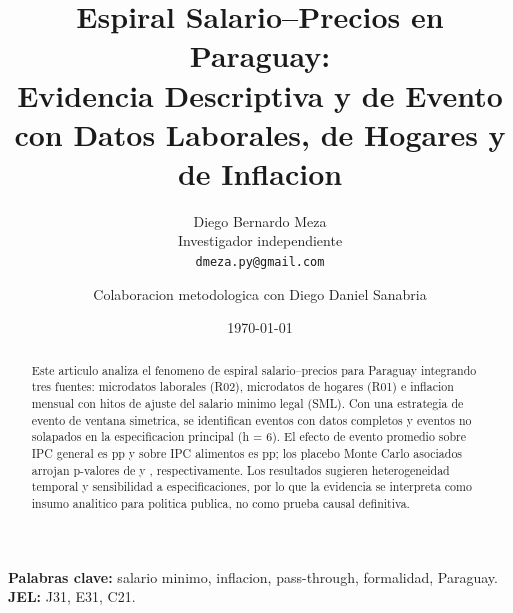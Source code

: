 \documentclass[12pt]{article}
\title{Espiral Salario--Precios en Paraguay:\\
Evidencia Descriptiva y de Evento con Datos Laborales, de Hogares y de Inflacion}
\author{
Diego Bernardo Meza\\
\small Investigador independiente\\
\small \texttt{dmeza.py@gmail.com}
\and
Colaboracion metodologica con Diego Daniel Sanabria
}
\date{\today}
\begin{document}
\maketitle

\begin{abstract}
Este articulo analiza el fenomeno de espiral salario--precios para Paraguay integrando tres fuentes: microdatos laborales (R02), microdatos de hogares (R01) e inflacion mensual con hitos de ajuste del salario minimo legal (SML). Con una estrategia de evento de ventana simetrica, se identifican \nEventosTotal{} eventos con datos completos y \nEventosMain{} eventos no solapados en la especificacion principal (h = 6). El efecto de evento promedio sobre IPC general es \eiGeneralMain{} pp y sobre IPC alimentos es \eiAlimentosMain{} pp; los placebo Monte Carlo asociados arrojan p-valores de \pGeneralMain{} y \pAlimentosMain{}, respectivamente. Los resultados sugieren heterogeneidad temporal y sensibilidad a especificaciones, por lo que la evidencia se interpreta como insumo analitico para politica publica, no como prueba causal definitiva.
\end{abstract}

\noindent\textbf{Palabras clave:} salario minimo, inflacion, pass-through, formalidad, Paraguay.\\
\textbf{JEL:} J31, E31, C21.









\end{document}
